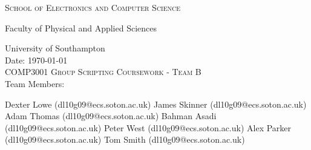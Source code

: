 
\begin{titlepage}
	
\begin{center}

\textsc{\large{School of Electronics and Computer Science}}

\large{Faculty of Physical and Applied Sciences}

\large{University of Southampton}\\[3.5cm]

\large{Date: \today}\\[4.0cm]

\textsc{\LARGE COMP3001 Group Scripting Coursework - Team B}\\[4.5cm] 

\large{Team Members:}

\large{Dexter Lowe (dl10g09@ecs.soton.ac.uk)}
\large{James Skinner (dl10g09@ecs.soton.ac.uk)}
\large{Adam Thomas (dl10g09@ecs.soton.ac.uk)}
\large{Bahman Asadi (dl10g09@ecs.soton.ac.uk)}
\large{Peter West (dl10g09@ecs.soton.ac.uk)}
\large{Alex Parker (dl10g09@ecs.soton.ac.uk)}
\large{Tom Smith (dl10g09@ecs.soton.ac.uk)}

\vfill

\large{}
\end{center}

\end{titlepage}
